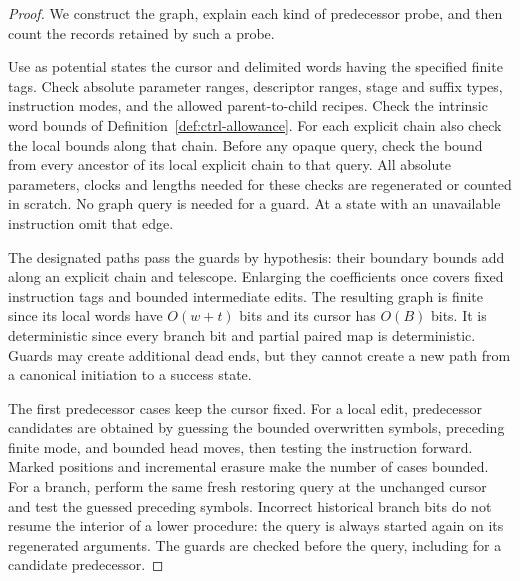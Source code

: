 \begin{proof}
We construct the graph, explain each kind of predecessor probe, and then count the records retained by such a probe.

Use as potential states the cursor and delimited words having the
specified finite tags.  Check absolute parameter ranges, descriptor
ranges, stage and suffix types, instruction modes, and the allowed
parent-to-child recipes.  Check the intrinsic word bounds of
Definition~\ref{def:ctrl-allowance}.  For each explicit chain also check
the local bounds along that chain.  Before any opaque query, check the
bound from every ancestor of its local explicit chain to that query.
All absolute parameters, clocks and lengths needed for these checks are
regenerated or counted in scratch.  No graph query is needed for a
guard.  At a state with an unavailable instruction omit that edge.

The designated paths pass the guards by hypothesis: their boundary
bounds add along an explicit chain and telescope.  Enlarging the
coefficients once covers fixed instruction tags and bounded intermediate
edits.  The resulting graph is finite since its local words have
$O(w+t)$ bits and its cursor has $O(B)$ bits.  It is deterministic since
every branch bit and partial paired map is deterministic.  Guards may
create additional dead ends, but they cannot create a new path from a
canonical initiation to a success state.

The first predecessor cases keep the cursor fixed. For a local edit, predecessor candidates are obtained by guessing the
bounded overwritten symbols, preceding finite mode, and bounded head
moves, then testing the instruction forward.  Marked positions and
incremental erasure make the number of cases bounded.  For a branch,
perform the same fresh restoring query at the unchanged cursor and test
the guessed preceding symbols.  Incorrect historical branch bits do not
resume the interior of a lower procedure: the query is always started
again on its regenerated arguments.  The guards are checked before the
query, including for a candidate predecessor.


\end{proof}
